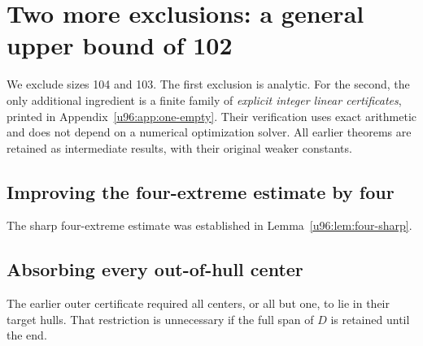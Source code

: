 \documentclass[11pt,a4paper]{article}
\theoremstyle{remark}
\begin{document}
\section{Two more exclusions: a general upper bound of 102}\label{u96:sec:upper102}
We exclude sizes 104 and 103. The first exclusion is analytic.
For the second, the only additional ingredient is a finite family of
\emph{explicit integer linear certificates}, printed in
Appendix~\ref{u96:app:one-empty}. Their verification uses exact arithmetic and
does not depend on a numerical optimization solver. All earlier theorems
are retained as intermediate results, with their original weaker constants.

\subsection{Improving the four-extreme estimate by four}
The sharp four-extreme estimate was established in Lemma~\ref{u96:lem:four-sharp}.

\subsection{Absorbing every out-of-hull center}
The earlier outer certificate required all centers, or all but one, to lie
in their target hulls. That restriction is unnecessary if the full span of
$D$ is retained until the end.
\end{document}
